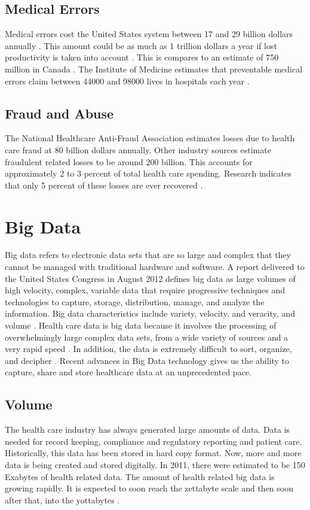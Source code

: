 \documentclass[sigconf]{acmart}
\begin{document}
\subsection{Medical Errors}
Medical errors cost the United States system between 17 and 29 billion dollars annually \cite{milbank}. This amount could be as much as 1 trillion dollars a year if lost productivity is taken into account \cite{www-google-pracfus}. This is compares to an estimate of 750 million in Canada \cite{milbank}.  The Institute of Medicine estimates that preventable medical errors claim between 44000 and 98000 lives in hospitals each year \cite{milbank}.

\subsection{Fraud and Abuse}
The National Healthcare Anti-Fraud Association estimates losses due to health care fraud at 80 billion dollars annually. Other industry sources estimate fraudulent related losses to be around 200 billion. This accounts for approximately 2 to 3 percent of total health care spending. Research indicates that only 5 percent of these losses are ever recovered \cite{www-google-datameer}.

\section{Big Data}

Big data refers to electronic data sets that are so large and complex that they cannot be managed with traditional hardware and software. A report delivered to the United States Congress in August 2012 defines big data as large volumes of high velocity, complex, variable data that require progressive techniques and technologies to capture, storage, distribution, manage, and analyze the information. Big data characteristics include variety, velocity, and veracity, and volume \cite{springer}.  Health care data is big data because it involves the processing of overwhelmingly large complex data sets, from a wide variety of sources and a very rapid speed \cite{springer}.  In addition, the data is extremely difficult to sort, organize, and decipher \cite{www-google-digit}.  Recent advances in Big Data technology gives us the ability to capture, share and store healthcare data at an unprecedented pace.

\subsection{Volume}
The health care industry has always generated large amounts of data.  Data is needed for record keeping, compliance and regulatory reporting and patient care. Historically, this data has been stored in hard copy format. Now, more and more data is being created and stored digitally. In 2011, there were estimated to be 150 Exabytes of health related data. The amount of health related big data is growing rapidly. It is expected to soon reach the zettabyte scale and then soon after that, into the yottabytes \cite{springer}.
\end{document}
